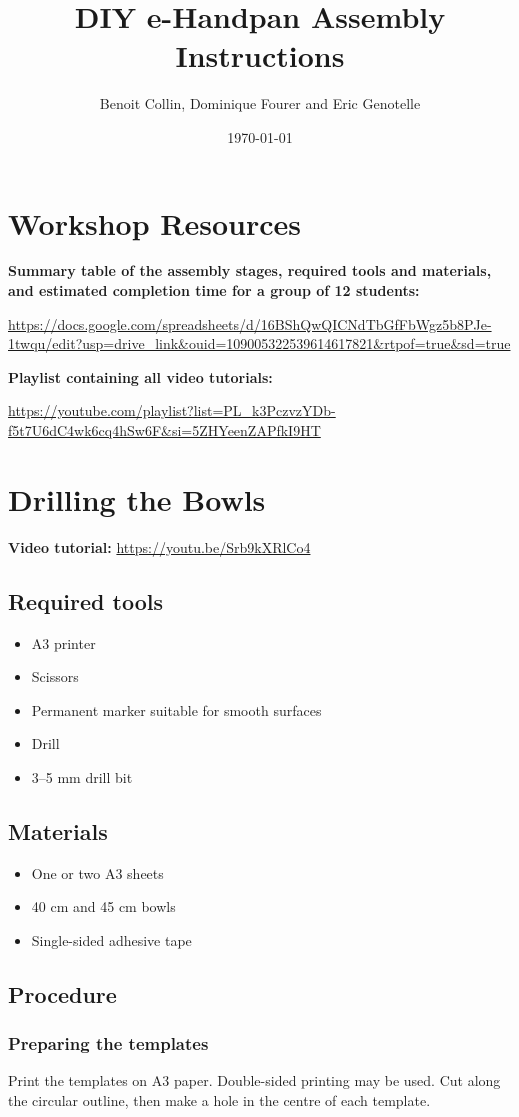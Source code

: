 \documentclass[11pt,a4paper]{article}
\title{DIY e-Handpan Assembly Instructions}
\author{Benoit Collin, Dominique Fourer and Eric Genotelle}
\date{\today}
\newcommand{\tutorial}[1]{\textbf{Video tutorial:} \url{#1}}
\newcommand{\tools}{\subsection{Required tools}}
\newcommand{\materials}{\subsection{Materials}}
\newcommand{\procedure}{\subsection{Procedure}}
\begin{document}
\maketitle
\tableofcontents
\newpage

\section*{Workshop Resources}

\textbf{Summary table of the assembly stages, required tools and materials, and estimated completion time for a group of 12 students:}

\url{https://docs.google.com/spreadsheets/d/16BShQwQICNdTbGfFbWgz5b8PJe-1twqu/edit?usp=drive_link&ouid=109005322539614617821&rtpof=true&sd=true}

\textbf{Playlist containing all video tutorials:}

\url{https://youtube.com/playlist?list=PL_k3PczvzYDb-f5t7U6dC4wk6cq4hSw6F&si=5ZHYeenZAPfkI9HT}

\section{Drilling the Bowls}
\tutorial{https://youtu.be/Srb9kXRlCo4}

\tools
\begin{itemize}
  \item A3 printer
  \item Scissors
  \item Permanent marker suitable for smooth surfaces
  \item Drill
  \item 3--5 mm drill bit
\end{itemize}

\materials
\begin{itemize}
  \item One or two A3 sheets
  \item 40 cm and 45 cm bowls
  \item Single-sided adhesive tape
\end{itemize}

\procedure
\subsubsection{Preparing the templates}
Print the templates on A3 paper. Double-sided printing may be used. Cut along the circular outline, then make a hole in the centre of each template.
\end{document}
